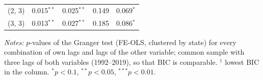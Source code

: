 \begin{table}[htbp]
\begin{threeparttable}
\begin{tabular}{lcccc}
\quad (2, 3) & 0.015$^{**}$ & 0.025$^{**}$ & 0.149 & 0.069$^{*}$ \\
\quad (3, 3) & 0.013$^{**}$ & 0.027$^{**}$ & 0.185 & 0.086$^{*}$ \\
\bottomrule
\end{tabular}
\begin{tablenotes}[flushleft]\footnotesize
\item \textit{Notes:} $p$-values of the Granger test (FE-OLS, clustered by state) for every combination of own lags and lags of the other variable; common sample with three lags of both variables (1992--2019), so that BIC is comparable. $^{\dagger}$ lowest BIC in the column. $^{*}p<0.1$, $^{**}p<0.05$, $^{***}p<0.01$.
\end{tablenotes}
\end{threeparttable}
\end{table}

